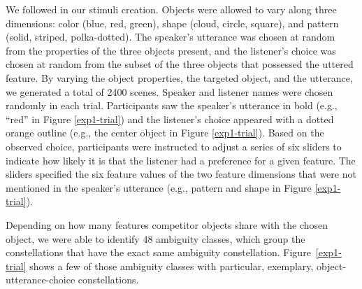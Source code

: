 \documentclass[10pt,a4paper]{article}
\begin{document}
We followed  in our stimuli creation. Objects were allowed to vary along three dimensions: color (blue, red, green), shape (cloud, circle, square), and pattern (solid, striped, polka-dotted). The speaker's utterance was chosen at random from the properties of the three objects present, and the listener's choice was chosen at random from the subset of the three objects that possessed the uttered feature. By varying the object properties, the targeted object, and the utterance, we generated a total of 2400 scenes. Speaker and listener names were chosen randomly in each trial. Participants saw the speaker's utterance in bold (e.g., ``red'' in Figure \ref{exp1-trial}) and the listener's choice appeared with a dotted orange outline (e.g., the center object in Figure \ref{exp1-trial}). Based on the observed choice, participants were instructed to adjust a series of six sliders to indicate how likely it is that the listener had a preference for a given feature. The sliders specified the six feature values of the two feature dimensions that were not mentioned in the speaker's utterance (e.g., pattern and shape in Figure \ref{exp1-trial}). 

Depending on how many features competitor objects share with the chosen object, we were able to identify 48 ambiguity classes, which group the constellations that have the exact same ambiguity constellation. Figure~\ref{exp1-trial} shows a few of those ambiguity classes with particular, exemplary, object-utterance-choice constellations.
\end{document}
